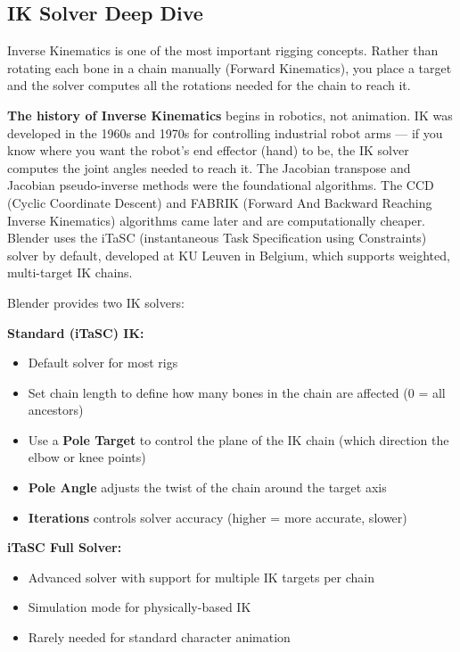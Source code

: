\subsection{IK Solver Deep Dive}
\label{subsec:ik-solver}

Inverse Kinematics is one of the most important rigging concepts. Rather than rotating each bone in a chain manually (Forward Kinematics), you place a target and the solver computes all the rotations needed for the chain to reach it.

\begin{historynote}
\textbf{The history of Inverse Kinematics} begins in robotics, not animation. IK was developed in the 1960s and 1970s for controlling industrial robot arms --- if you know where you want the robot's end effector (hand) to be, the IK solver computes the joint angles needed to reach it. The Jacobian transpose and Jacobian pseudo-inverse methods were the foundational algorithms. The CCD (Cyclic Coordinate Descent) and FABRIK (Forward And Backward Reaching Inverse Kinematics) algorithms came later and are computationally cheaper. Blender uses the iTaSC (instantaneous Task Specification using Constraints) solver by default, developed at KU Leuven in Belgium, which supports weighted, multi-target IK chains.
\end{historynote}

Blender provides two IK solvers:

\textbf{Standard (iTaSC) IK:}
\begin{itemize}[leftmargin=2em]
  \item Default solver for most rigs
  \item Set chain length to define how many bones in the chain are affected (0 = all ancestors)
  \item Use a \textbf{Pole Target} to control the plane of the IK chain (which direction the elbow or knee points)
  \item \textbf{Pole Angle} adjusts the twist of the chain around the target axis
  \item \textbf{Iterations} controls solver accuracy (higher = more accurate, slower)
\end{itemize}

\textbf{iTaSC Full Solver:}
\begin{itemize}[leftmargin=2em]
  \item Advanced solver with support for multiple IK targets per chain
  \item Simulation mode for physically-based IK
  \item Rarely needed for standard character animation
\end{itemize}

